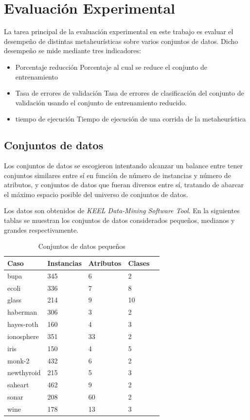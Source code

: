 \documentclass[11pt]{article}
\begin{document}
\section{Evaluación Experimental}

La tarea principal de la evaluación experimental en este trabajo es evaluar el desempeño de distintas metaheurísticas sobre varios conjuntos de datos. Dicho desempeño se mide mediante tres indicadores: 
\begin{itemize}
\item Porcentaje reducción 
    Porcentaje al cual se reduce el conjunto de entrenamiento
\item Tasa de errores de validación
    Tasa de errores de clasificación del conjunto de validación usando el conjunto de entrenamiento reducido.
\item tiempo de ejecución
    Tiempo de ejecución de una corrida de la metaheurística
\end{itemize}


\subsection{Conjuntos de datos}
Los conjuntos de datos se escogieron intentando alcanzar un balance entre tener conjuntos similares entre sí en función de número de instancias y número de atributos, y conjuntos de datos que fueran diversos entre sí, tratando de abarcar el máximo espacio posible del universo de conjuntos de datos.

Los datos son obtenidos de \emph{KEEL Data-Mining Software Tool}. En la siguientes tablas se muestran los conjuntos de datos considerados pequeños, medianos y grandes respectivamente.

\begin{table}[h]
\begin{tabular}{ |l|l|l|l|l| }
    \hline
    Caso    & Instancias & Atributos & Clases \\ \hline
    bupa & 345  & 6 &  2 \\ \hline
    ecoli & 336 & 7 & 8 \\ \hline
    glass & 214 & 9 & 10 \\ \hline
    haberman & 306 & 3 & 2 \\ \hline
    hayes-roth & 160 & 4 & 3 \\ \hline
    ionosphere & 351 & 33 & 2 \\ \hline
    iris & 150 & 4 & 5 \\ \hline
    monk-2 & 432 & 6 & 2 \\ \hline
    newthyroid & 215  & 5 & 3 \\ \hline
    saheart & 462 & 9 & 2 \\ \hline
    sonar & 208 & 60 & 2 \\ \hline
    wine & 178 & 13 & 3 \\ \hline
\end{tabular}
\caption{Conjuntos de datos pequeños}
\label{tabla:1}
\end{table}
\end{document}
